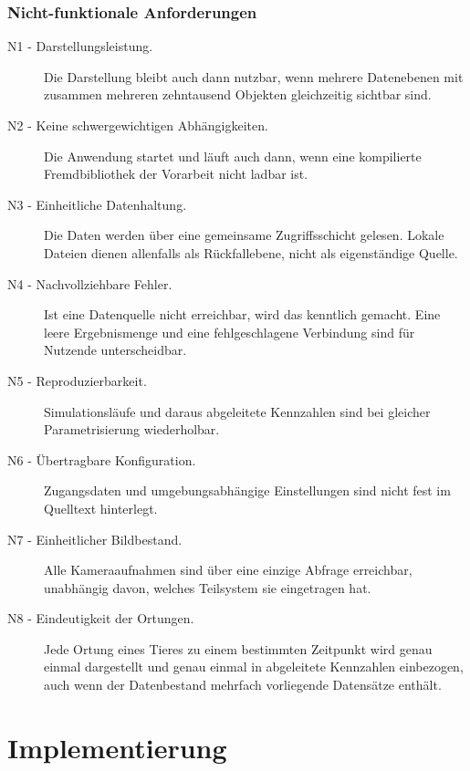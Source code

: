 \documentclass[12pt,a4paper]{report}
\begin{document}
\subsection{Nicht-funktionale Anforderungen}

\begin{description}
    \item[N1 - Darstellungsleistung.] Die Darstellung bleibt auch dann nutzbar, wenn
    mehrere Datenebenen mit zusammen mehreren zehntausend Objekten gleichzeitig sichtbar
    sind.

    \item[N2 - Keine schwergewichtigen Abhängigkeiten.] Die Anwendung startet und läuft
    auch dann, wenn eine kompilierte Fremdbibliothek der Vorarbeit nicht ladbar ist.

    \item[N3 - Einheitliche Datenhaltung.] Die Daten werden über eine gemeinsame
    Zugriffsschicht gelesen. Lokale Dateien dienen allenfalls als Rückfallebene, nicht als
    eigenständige Quelle.

    \item[N4 - Nachvollziehbare Fehler.] Ist eine Datenquelle nicht erreichbar, wird das
    kenntlich gemacht. Eine leere Ergebnismenge und eine fehlgeschlagene Verbindung sind
    für Nutzende unterscheidbar.

    \item[N5 - Reproduzierbarkeit.] Simulationsläufe und daraus abgeleitete Kennzahlen
    sind bei gleicher Parametrisierung wiederholbar.

    \item[N6 - Übertragbare Konfiguration.] Zugangsdaten und umgebungsabhängige
    Einstellungen sind nicht fest im Quelltext hinterlegt.

    \item[N7 - Einheitlicher Bildbestand.] Alle Kameraaufnahmen sind über eine einzige
    Abfrage erreichbar, unabhängig davon, welches Teilsystem sie eingetragen hat.

    \item[N8 - Eindeutigkeit der Ortungen.] Jede Ortung eines Tieres zu einem bestimmten
    Zeitpunkt wird genau einmal dargestellt und genau einmal in abgeleitete Kennzahlen
    einbezogen, auch wenn der Datenbestand mehrfach vorliegende Datensätze enthält.
\end{description}

\chapter{Implementierung}
\label{chap:implementierung}
\end{document}
